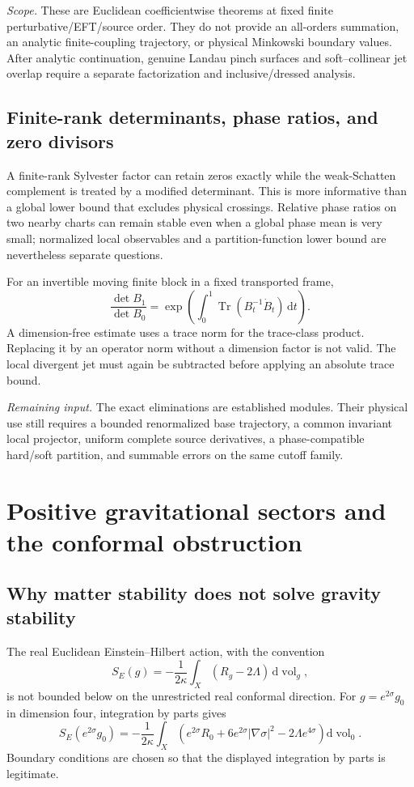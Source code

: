 \documentclass[11pt,a4paper,oneside]{book}
\theoremstyle{plain}
\theoremstyle{definition}
\theoremstyle{remark}
\newcommand{\dd}{\mathrm d}
\newcommand{\Tr}{\operatorname{Tr}}
\newcommand{\vol}{\operatorname{vol}}
\newcommand{\scope}[1]{\par\smallskip\noindent\textit{Scope.} #1\par\smallskip}
\newcommand{\gate}[1]{\par\smallskip\noindent\textit{Remaining input.} #1\par\smallskip}
\begin{document}
\scope{These are Euclidean coefficientwise theorems at fixed finite
perturbative/EFT/source order.  They do not provide an all-orders summation, an
analytic finite-coupling trajectory, or physical Minkowski boundary values.
After analytic continuation, genuine Landau pinch surfaces and soft--collinear
jet overlap require a separate factorization and inclusive/dressed analysis.}

\section{Finite-rank determinants, phase ratios, and zero divisors}
A finite-rank Sylvester factor can retain zeros exactly while the weak-Schatten complement is treated by a modified determinant. This is more informative than a global lower bound that excludes physical crossings. Relative phase ratios on two nearby charts can remain stable even when a global phase mean is very small; normalized local observables and a partition-function lower bound are nevertheless separate questions.

For an invertible moving finite block in a fixed transported frame,
\begin{equation}
 \frac{\det B_1}{\det B_0}
 =\exp\left(\int_0^1\Tr(B_t^{-1}\dot B_t)\,\dd t\right).
 \label{eq:logdet-path}
\end{equation}
A dimension-free estimate uses a trace norm for the trace-class product. Replacing it by an operator norm without a dimension factor is not valid. The local divergent jet must again be subtracted before applying an absolute trace bound. \cite{R6,R7,R11}

\gate{The exact eliminations are established modules. Their physical use still requires a bounded renormalized base trajectory, a common invariant local projector, uniform complete source derivatives, a phase-compatible hard/soft partition, and summable errors on the same cutoff family.}


\chapter{Positive gravitational sectors and the conformal obstruction}
\label{ch:positive-gravity}
\section{Why matter stability does not solve gravity stability}
The real Euclidean Einstein--Hilbert action, with the convention
\begin{equation}
 S_E(g)=-\frac1{2\kappa}\int_X(R_g-2\Lambda)\,\dd\vol_g,
\end{equation}
is not bounded below on the unrestricted real conformal direction. For $g=e^{2\sigma}g_0$ in dimension four, integration by parts gives
\begin{equation}
 S_E(e^{2\sigma}g_0)
 =-\frac1{2\kappa}\int_X
 \left(e^{2\sigma}R_0+6e^{2\sigma}|\nabla\sigma|^2
       -2\Lambda e^{4\sigma}\right)\dd\vol_0.
 \label{eq:conformal-action}
\end{equation}
Boundary conditions are chosen so that the displayed integration by parts is legitimate.
\end{document}
